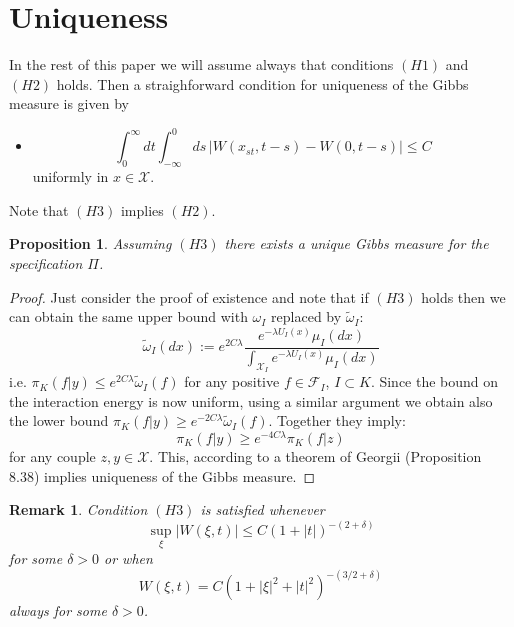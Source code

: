 \documentclass[a4paper,12pt,reqno]{amsart}
\newtheorem{proposition}[theorem]{Proposition}
\newtheorem{remark}[theorem]{Remark}
\newcommand{\X}{\mathcal{X}}
\begin{document}
\section{Uniqueness}
\label{sec:uniqueness}
In the rest of this paper we will assume always that conditions $(H1)$ and $(H2)$ holds. 
Then a straighforward condition for uniqueness of the Gibbs measure is given by
\begin{itemize}
\item[H3)]
$$
\int_0^\infty dt \int^0_{-\infty} ds \,|W(x_{st},t-s)-W(0,t-s)| \le C
$$
uniformly in $x \in \X$.
\end{itemize}
Note that $(H3)$ implies $(H2)$.
\begin{proposition}
\label{prop:unique1}
Assuming $(H3)$ there exists a unique Gibbs measure for the
specification $\Pi$.  
\end{proposition}
\begin{proof}
Just consider the proof of existence and note that
 if $(H3)$ holds then we can obtain the same upper bound with
$\omega_I$ replaced by $\widetilde\omega_I$:
$$
\widetilde\omega_I(dx) := e^{2C\lambda} \frac{   e^{-\lambda U_I(x)}  \mu_I(dx)}{ \int_{\X_I}  e^{-\lambda U_I(x) }\mu_I(dx)}
$$
i.e. $\pi_K(f|y) \le e^{2C\lambda}
 \widetilde \omega_I(f)
$ for any positive $f \in \mathcal{F}_I$, $I \subset K$. Since the bound on the interaction energy is now uniform, using  a similar argument we obtain also the lower bound
$\pi_K(f|y)  \ge e^{-2C\lambda}
 \widetilde \omega_I(f)
$.
Together they imply:
\begin{equation}
  \pi_K(f|y)  \ge e^{-4 C\lambda}
\pi_K(f|z)
\end{equation}
for any couple $z,y \in \X$. This, according to a theorem of Georgii
(Proposition 8.38) implies uniqueness of the Gibbs measure.
\end{proof}

\begin{remark}
Condition $(H3)$ is satisfied whenever
$$
\sup_{\xi} |W(\xi,t)| \le C (1+|t|)^{-(2+\delta)}
$$
for some $\delta > 0$ or when
$$
W(\xi,t) = C (1+|\xi|^2+|t|^2)^{-(3/2+\delta)}
$$  
always for some $\delta > 0$.
\end{remark}

\end{document}
